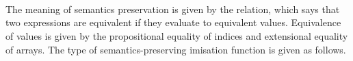 \begin{code}%
%
\>[2]\AgdaSpace{}%
\AgdaSpace{}%
\AgdaSymbol{(}\AgdaSpace{}%
\AgdaSymbol{:}\AgdaSpace{}%
\AgdaSymbol{)}\AgdaSpace{}%
\AgdaSymbol{:}\AgdaSpace{}%
\AgdaSpace{}%
\<%
\\
\>[2][@{}l@{\AgdaIndent{0}}]%
\>[4]\AgdaSpace{}%
\AgdaSpace{}%
\AgdaSymbol{;}\AgdaSpace{}%
\<%
\\
\>[4][@{}l@{\AgdaIndent{0}}]%
\>[6]\AgdaSpace{}%
\AgdaSymbol{:}\AgdaSpace{}%
\AgdaSpace{}%
\AgdaSymbol{\{}\AgdaSymbol{\}}\AgdaSpace{}%
\AgdaSpace{}%
\AgdaSpace{}%
\AgdaSpace{}%
\AgdaOperator{\AgdaFunction{+}}\AgdaSpace{}%
%
\>[37]\AgdaSpace{}%
\AgdaSymbol{;}%
\>[43]\AgdaSpace{}%
\AgdaSymbol{:}\AgdaSpace{}%
\AgdaSpace{}%
\AgdaSymbol{\{}\AgdaSymbol{\}}\AgdaSpace{}%
\AgdaSpace{}%
\AgdaSpace{}%
\AgdaOperator{\AgdaFunction{+}}\AgdaSpace{}%
\AgdaSpace{}%
%
\>[74]\AgdaSpace{}%
\<%
\\
%
\>[6]\AgdaSpace{}%
\AgdaSymbol{:}\AgdaSpace{}%
\AgdaSpace{}%
\AgdaSymbol{\{}\AgdaSymbol{\}}\AgdaSpace{}%
\AgdaSpace{}%
\AgdaSpace{}%
\AgdaSpace{}%
\AgdaOperator{\AgdaFunction{*}}\AgdaSpace{}%
%
\>[37]\AgdaSpace{}%
\AgdaSymbol{;}%
\>[43]\AgdaSpace{}%
\AgdaSymbol{:}\AgdaSpace{}%
\AgdaSpace{}%
\AgdaSymbol{\{}\AgdaSymbol{\}}\AgdaSpace{}%
\AgdaSpace{}%
\AgdaSpace{}%
\AgdaOperator{\AgdaFunction{*}}\AgdaSpace{}%
\AgdaSpace{}%
%
\>[74]\AgdaSpace{}%
\<%
\end{code}
The meaning of semantics preservation is given by the 
relation, which says that two expressions are equivalent if they evaluate
to equivalent values.  Equivalence of values is given by the propositional
equality of indices and extensional equality of arrays.  The type of
semantics-preserving imisation function is given as follows.
\begin{code}[hide]%
%
\>[2]\<%
\\
\>[2][@{}l@{\AgdaIndent{0}}]%
\>[4]\AgdaSpace{}%
\AgdaSymbol{:}\AgdaSpace{}%
\<%
\\
%
\\[\AgdaEmptyExtraSkip]%
%
\>[2]\AgdaSpace{}%
\AgdaSpace{}%
\<%
\end{code}
